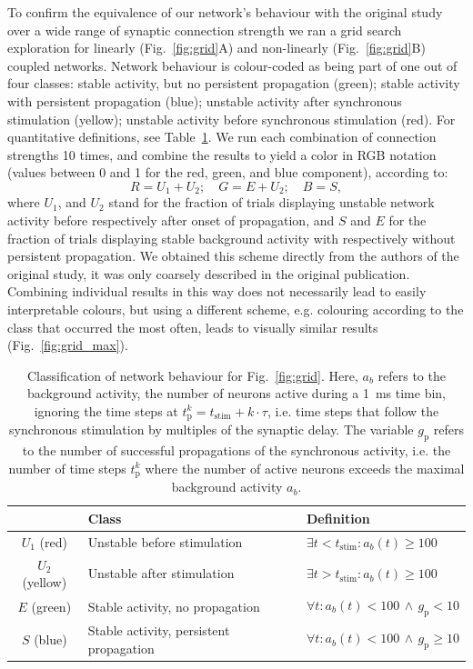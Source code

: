 \documentclass[10pt,a4paper,onecolumn]{article}
\begin{document}
To confirm the equivalence of our network's behaviour with the original study over a wide range of synaptic connection strength we ran a grid search exploration for linearly (Fig.~\ref{fig:grid}A) and non-linearly (Fig.~\ref{fig:grid}B) coupled networks. Network behaviour is colour-coded as being part of one out of four classes: stable activity, but no persistent propagation (green); stable activity with persistent propagation (blue); unstable activity after synchronous stimulation (yellow); unstable activity before synchronous stimulation (red). For quantitative definitions, see Table~\ref{tab:color}. We run each combination of connection strengths 10 times, and combine the results to yield a color in RGB notation (values between 0 and 1 for the red, green, and blue component), according to:
\begin{equation}
R = U_1 + U_2;\quad G = E + U_2;\quad B = S,
\end{equation}
where $U_1$, and $U_2$ stand for the fraction of trials displaying unstable network activity before respectively after onset of propagation, and $S$ and $E$ for the fraction of trials displaying stable background activity with respectively without persistent propagation. We obtained this scheme directly from the authors of the original study, it was only coarsely described in the original publication. Combining individual results in this way does not necessarily lead to easily interpretable colours, but using a different scheme, e.g. colouring according to the class that occurred the most often, leads to visually similar results (Fig.~\ref{fig:grid_max}).

\begin{table}
\begin{tabular}{ c  l  p{}}
  \toprule
   & Class & Definition \\
  \midrule
  $U_1$ (red) & Unstable before stimulation & $\exists t<t_\text{stim}: a_b(t) \geq 100$ \\
  $U_2$ (yellow) & Unstable after stimulation & $\exists t>t_\text{stim}: a_b(t) \geq 100$ \\
  $E$ (green) &  Stable activity, no propagation & $\forall t: a_b(t) < 100\, \wedge\, g_\text{p} < 10$\\
  $S$ (blue) & Stable activity, persistent propagation & $\forall t: a_b(t) < 100\, \wedge\, g_\text{p} \geq 10$\\
  \bottomrule
\end{tabular}
\caption{Classification of network behaviour for Fig.~\ref{fig:grid}. Here, $a_b$ refers to the background activity, the number of neurons active during a \SI{1}{\milli\second} time bin, ignoring the time steps at $t_\text{p}^k = t_\text{stim} + k\cdot\tau$, i.e. time steps that follow the synchronous stimulation by multiples of the synaptic delay. The variable $g_\text{p}$ refers to the number of successful propagations of the synchronous activity, i.e. the number of time steps $t_\text{p}^k$ where the number of active neurons exceeds the maximal background activity $a_b$.}\label{tab:color}
\end{table}
\end{document}
